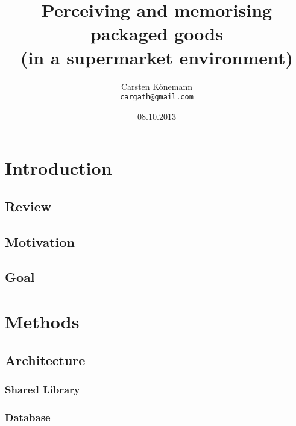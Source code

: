 \documentclass[11pt, twoside, a4paper]{report}
\begin{document}
\title{Perceiving and memorising packaged goods \\ (in a supermarket environment)}
\author{Carsten K\"onemann \\ \texttt{cargath@gmail.com}}
\date{08.10.2013}

\maketitle


\tableofcontents

\chapter{Introduction}

\section{Review}

\section{Motivation}

\section{Goal}


\chapter{Methods}

\section{Architecture}
\subsection{Shared Library}
\subsection{Database}
\end{document}
